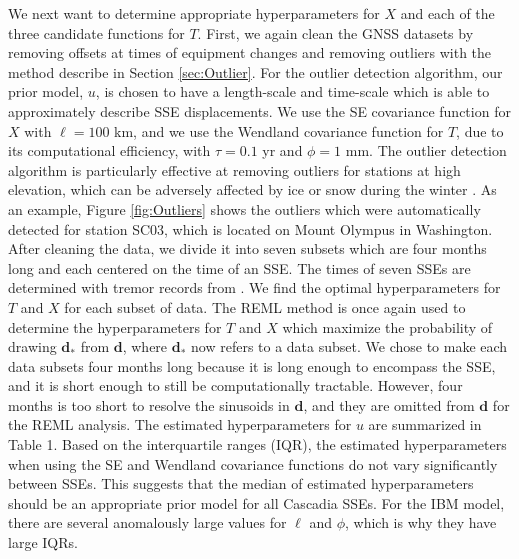 \documentclass[10pt,letter]{article}
\begin{document}
We next want to determine appropriate hyperparameters for $X$ and each of the three candidate functions for $T$. First, we again clean the GNSS datasets by removing offsets at times of equipment changes and removing outliers with the method describe in Section \ref{sec:Outlier}. For the outlier detection algorithm, our prior model, $u$, is chosen to have a length-scale and time-scale which is able to approximately describe SSE displacements. We use the SE covariance function for $X$ with $\ell = 100$ km, and we use the Wendland covariance function for $T$, due to its computational efficiency, with $\tau = 0.1$ yr and $\phi = 1$ mm. The outlier detection algorithm is particularly effective at removing outliers for stations at high elevation, which can be adversely affected by ice or snow during the winter \citep{Lisowski2008}. As an example, Figure \ref{fig:Outliers} shows the outliers which were automatically detected for station SC03, which is located on Mount Olympus in Washington.  After cleaning the data, we divide it into seven subsets which are four months long and each centered on the time of an SSE. The times of seven SSEs are determined with tremor records from \cite{Wech2010}. We find the optimal hyperparameters for $T$ and $X$ for each subset of data. The REML method is once again used to determine the hyperparameters for $T$ and $X$ which maximize the probability of drawing $\bm{d}_*$ from $\bm{d}$, where $\bm{d}_*$ now refers to a data subset. We chose to make each data subsets four months long because it is long enough to encompass the SSE, and it is short enough to still be computationally tractable. However, four months is too short to resolve the sinusoids in $\bm{d}$, and they are omitted from $\bm{d}$ for the REML analysis. The estimated hyperparameters for $u$ are summarized in Table 1. Based on the interquartile ranges (IQR), the estimated hyperparameters when using the SE and Wendland covariance functions do not vary significantly between SSEs. This suggests that the median of estimated hyperparameters should be an appropriate prior model for all Cascadia SSEs. For the IBM model, there are several anomalously large values for $\ell$ and $\phi$, which is why they have large IQRs.   
\end{document}
